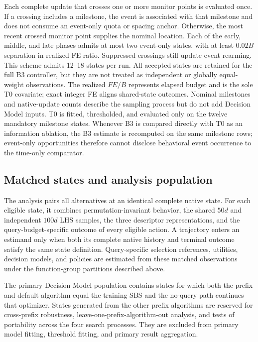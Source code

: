 Each complete update that crosses one or more monitor points is evaluated once.
If a crossing includes a milestone, the event is associated with that milestone
and does not consume an event-only quota or spacing anchor.  Otherwise, the most
recent crossed monitor point supplies the nominal location.  Each of the early,
middle, and late phases admits at most two event-only states, with at least
$0.02B$ separation in realized FE ratio.  Suppressed crossings still update
event rearming.  This scheme admits 12--18 states per run.  All accepted states
are retained for the full B3 controller, but they are not treated as independent
or globally equal-weight observations.  The realized $FE/B$ represents elapsed
budget and is the sole T0 covariate; exact integer FE aligns shared-state
outcomes.  Nominal milestones and native-update counts describe the sampling
process but do not add Decision Model inputs.  T0 is fitted, thresholded, and
evaluated only on the twelve mandatory milestone states.  Whenever B3 is
compared directly with T0 as an information ablation, the B3 estimate is
recomputed on the same milestone rows; event-only opportunities therefore
cannot disclose behavioral event occurrence to the time-only comparator.

\subsection{Matched states and analysis population}

The analysis pairs all alternatives at an identical complete native state.
For each eligible state, it combines permutation-invariant behavior, the shared
$50d$ and independent $100d$ LHS samples, the three descriptor representations,
and the query-budget-specific outcome of every eligible action.  A trajectory
enters an estimand only when both its complete native history and terminal
outcome satisfy the same state definition.  Query-specific selection
references, utilities, decision models, and policies are estimated from these
matched observations under the function-group partitions described above.

The primary Decision Model population contains states for which both the prefix
and default algorithm equal the training SBS and the no-query path continues
that optimizer.  States generated from the other prefix algorithms are reserved
for cross-prefix robustness, leave-one-prefix-algorithm-out analysis, and tests
of portability across the four search processes.  They are excluded from
primary model fitting, threshold fitting, and primary result aggregation.

